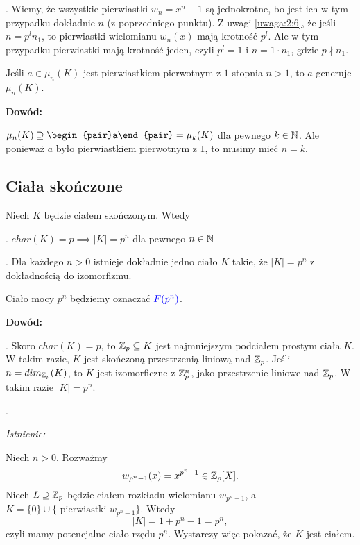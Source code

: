 
. Wiemy, że wszystkie pierwiastki $w_n=x^n-1$ są jednokrotne, bo jest ich w tym przypadku dokładnie $n$ (z poprzedniego punktu). Z uwagi \ref{uwaga:2:6}, że jeśli $n=p^ln_1$, to pierwiastki wielomianu $w_n(x)$ mają krotność $p^l$. Ale w tym przypadku pierwiastki mają krotność jeden, czyli $p^l=1$ i $n=1\cdot n_1$, gdzie $p\nmid n_1$.

\begin{wniosek}
    Jeśli $a\in \mu_n(K)$ jest pierwiastkiem pierwotnym z $1$ stopnia $n>1$, to $a$ generuje $\mu_n(K)$.
\end{wniosek}

\textbf{Dowód:}

$\mu_n(K)\supseteq\begin{pair}a\end{pair}=\mu_k(K)$ dla pewnego $k\in\mathbb{N}$. Ale ponieważ $a$ było pierwiastkiem pierwotnym z $1$, to musimy mieć $n=k$.

\subsection{Ciała skończone}

\begin{tw}
    Niech $K$ będzie ciałem skończonym. Wtedy

. $char(K)=p\implies |K|=p^n$ dla pewnego $n\in\mathbb{N}$

. Dla każdego $n>0$ istnieje dokładnie jedno ciało $K$ takie, że $|K|=p^n$ z dokładnością do izomorfizmu.

Ciało mocy $p^n$ będziemy oznaczać $\color{blue}F(p^n)$.
\end{tw}

\textbf{Dowód:}

. Skoro $char(K)=p$, to $\mathbb{Z}_p\subseteq K$ jest najmniejszym podciałem prostym ciała $K$. W takim razie, $K$ jest skończoną przestrzenią liniową nad $\mathbb{Z}_p$. Jeśli $n=dim_{\mathbb{Z}_p}(K)$, to $K$ jest izomorficzne z $\mathbb{Z}_p^n$, jako przestrzenie liniowe nad $\mathbb{Z}_p$. W takim razie $|K|=p^n$.

. 

\emph{Istnienie:}

Niech $n>0$. Rozważmy 
$$w_{p^{n}-1}(x)=x^{p^n-1}\in\mathbb{Z}_p[X].$$
Niech $L\supseteq\mathbb{Z}_p$ będzie ciałem rozkładu wielomianu $w_{p^n-1}$, a $K=\{0\}\cup\{\text{ pierwiastki }w_{p^n-1}\}$. Wtedy
$$|K|=1+p^n-1=p^n,$$
czyli mamy potencjalne ciało rzędu $p^n$. Wystarczy więc pokazać, że $K$ jest ciałem.

